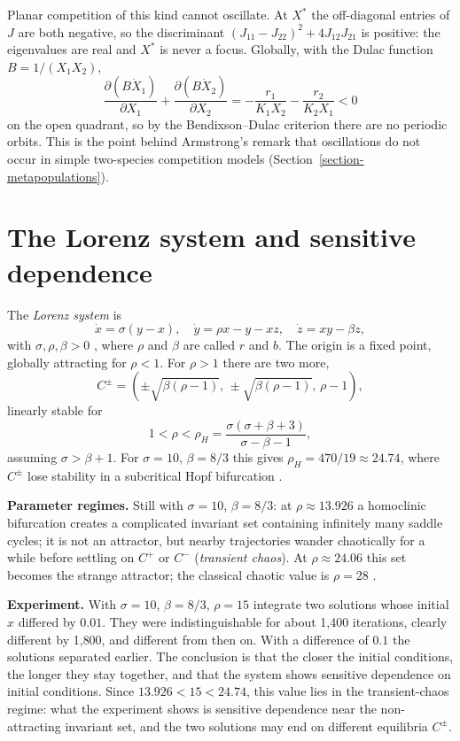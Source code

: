 \begin{remark}
\label{remark-competition-no-cycles}
Planar competition of this kind cannot
oscillate. At $X^*$ the off-diagonal
entries of $J$ are both negative, so the
discriminant $(J_{11}-J_{22})^2 +
4J_{12}J_{21}$ is positive: the eigenvalues
are real and $X^*$ is never a focus.
Globally, with the Dulac function
$B = 1/(X_1X_2)$,
$$
\frac{\partial (B\dot X_1)}{\partial X_1}
+ \frac{\partial (B\dot X_2)}{\partial X_2}
= -\frac{r_1}{K_1X_2}-\frac{r_2}{K_2X_1}
< 0
$$
on the open quadrant, so by the
Bendixson--Dulac criterion there are no
periodic orbits. This is the point behind
Armstrong's remark that oscillations do not
occur in simple two-species competition
models
(Section~\ref{section-metapopulations}).
\end{remark}

\section{The Lorenz system and sensitive
dependence}
\label{section-lorenz}

The \emph{Lorenz system} is
\begin{equation}
\label{equation-lorenz}
\dot x = \sigma(y-x),
\quad
\dot y = \rho x - y - xz,
\quad
\dot z = xy - \beta z,
\end{equation}
with $\sigma,\rho,\beta>0$
\cite[Section 9.2]{strogatz1994nonlinear},
where $\rho$ and $\beta$ are called $r$ and
$b$. The origin is a fixed point, globally
attracting for $\rho<1$. For $\rho>1$ there
are two more,
$$
C^{\pm} =
\left(\pm\sqrt{\beta(\rho-1)},\,
\pm\sqrt{\beta(\rho-1)},\,
\rho-1\right),
$$
linearly stable for
$$
1<\rho<\rho_H =
\frac{\sigma(\sigma+\beta+3)}
{\sigma-\beta-1},
$$
assuming $\sigma>\beta+1$. For
$\sigma=10$, $\beta=8/3$ this gives
$\rho_H = 470/19\approx 24.74$, where $C^\pm$
lose stability in a subcritical Hopf
bifurcation
\cite[Section 9.2]{strogatz1994nonlinear}.

\textbf{Parameter regimes.}
Still with $\sigma=10$, $\beta=8/3$: at
$\rho\approx 13.926$ a homoclinic
bifurcation creates a complicated invariant
set containing infinitely many saddle
cycles; it is not an attractor, but nearby
trajectories wander chaotically for a while
before settling on $C^+$ or $C^-$
(\emph{transient chaos}). At
$\rho\approx 24.06$ this set becomes the
strange attractor; the classical chaotic
value is $\rho=28$
\cite[Section 9.5]{strogatz1994nonlinear}.

\textbf{Experiment.}
With $\sigma=10$, $\beta=8/3$, $\rho=15$
integrate two solutions whose initial $x$
differed by $0.01$. They were
indistinguishable for about 1{,}400
iterations, clearly different by 1{,}800,
and different from then on. With a
difference of $0.1$ the solutions separated
earlier. The conclusion is that the closer the
initial conditions, the longer they stay
together, and that the system shows
sensitive dependence on initial conditions.
Since $13.926<15<24.74$, this value lies in
the transient-chaos regime: what the
experiment shows is sensitive dependence
near the non-attracting invariant set, and
the two solutions may end on different
equilibria $C^\pm$.

